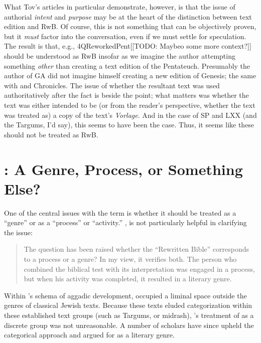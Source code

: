  What Tov's articles in particular demonstrate, however, is that the issue of authorial \emph{intent} and \emph{purpose} may be at the heart of the distinction between text edition and RwB. Of course, this is not something that can be objectively proven, but it \emph{must} factor into the conversation, even if we must settle for speculation. The result is that, e.g., 4QReworkedPent[[TODO: Maybeo some more context?]] should be understood as RwB insofar as we imagine the author attempting something \emph{other} than creating a text edition of the Pentateuch. Presumably the author of GA did not imagine himself creating a new edition of Genesis; the same with \jub and Chronicles. The issue of whether the resultant text was used authoritatively after the fact is beside the point; what matters was whether the text was either intended to be (or from the reader's perspective, whether the text was treated as) a copy of the text's \emph{Vorlage}. And in the case of SP and LXX (and the Targums, I'd say), this seems to have been the case. Thus, it seems like these should not be treated as RwB. 

 \hypertarget{rwb-a-genre-process-or-something-else}{%
\section{\RWB: A Genre, Process, or Something Else?}\label{rwb-a-genre-process-or-something-else}} 

 One of the central issues with the term \RwB is whether it should be treated as a ``genre'' or as a ``process'' or ``activity.'' \vermes, is not particularly helpful in clarifying the issue: 

 \begin{quote} The question has been raised whether the ``Rewritten Bible'' corresponds to a process or a genre? In my view, it verifies both. The person who combined the biblical test with its interpretation was engaged in a process, but when his activity was completed, it resulted in a literary genre.\autocite[8]{vermes_zsengeller2014} \end{quote} 

 Within \vermes's schema of aggadic development, \rwb occupied a liminal space outside the genres of classical Jewish texts. Because these texts eluded categorization within these established text groups (such as Targums, or midrash), \vermes's treatment of \rwb as a discrete group was not unreasonable. A number of scholars have since upheld the categorical approach and argued for \rwb as a literary genre. 

